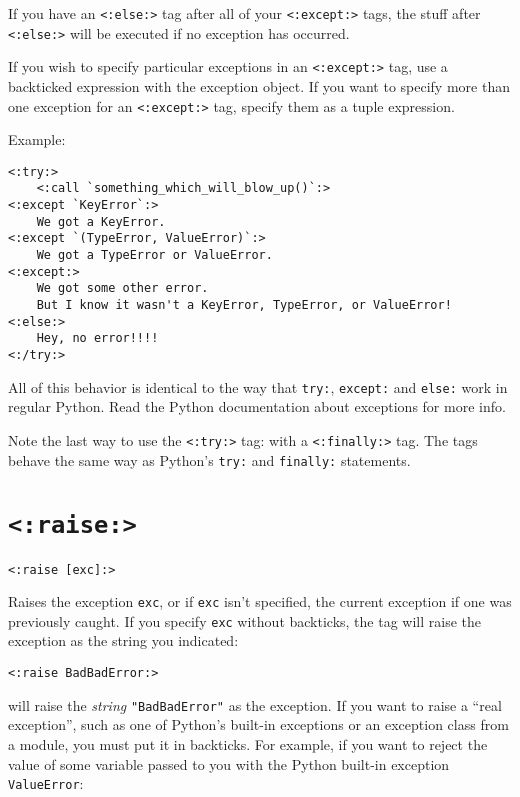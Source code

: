 \documentclass{manual}
\begin{document}
If you have an \texttt{<:else:>} tag after all of your 
\texttt{<:except:>} tags, the stuff after \texttt{<:else:>}
will be executed if no exception has occurred.

If you wish to specify particular exceptions in an
\texttt{<:except:>} tag, use a backticked expression
with the exception object. If you want to specify more than
one exception for an \texttt{<:except:>} tag, specify them
as a tuple expression. 

Example:

\begin{verbatim}
<:try:>
    <:call `something_which_will_blow_up()`:>
<:except `KeyError`:>
    We got a KeyError. 
<:except `(TypeError, ValueError)`:>
    We got a TypeError or ValueError.
<:except:>
    We got some other error. 
    But I know it wasn't a KeyError, TypeError, or ValueError!
<:else:>
    Hey, no error!!!!
<:/try:>
\end{verbatim}

All of this behavior is identical to the way that \texttt{try:},
\texttt{except:} and \texttt{else:} work in regular Python. 
Read the Python documentation about exceptions for more info.

Note the last way to use the \texttt{<:try:>} tag: with
a \texttt{<:finally:>} tag. The tags behave the same
way as Python's \texttt{try:} and \texttt{finally:} statements.


\section{\texttt{<:raise:>}}
\label{tagraise}

\begin{verbatim}<:raise [exc]:>\end{verbatim}

Raises the exception \texttt{exc}, or if \texttt{exc} isn't
specified, the current exception if
one was previously caught. If you specify \texttt{exc} without backticks,
the tag will raise the exception as the string you indicated:

\begin{verbatim}
<:raise BadBadError:>
\end{verbatim}

will raise the \emph{string} \texttt{"BadBadError"} as the exception.
If you want to raise a ``real exception'', such as one of Python's built-in
exceptions or an exception class from a module, you must put it in backticks.
For example, if you want to reject the value of some variable passed to you
with the Python built-in exception \texttt{ValueError}:
\end{document}
